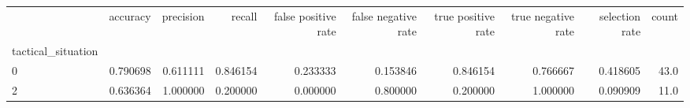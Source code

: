 \begin{tabular}{lrrrrrrrrr}
\toprule
{} &  accuracy &  precision &    recall &  false positive rate &  false negative rate &  true positive rate &  true negative rate &  selection rate &  count \\
tactical\_situation &           &            &           &                      &                      &                     &                     &                 &        \\
\midrule
0                  &  0.790698 &   0.611111 &  0.846154 &             0.233333 &             0.153846 &            0.846154 &            0.766667 &        0.418605 &   43.0 \\
2                  &  0.636364 &   1.000000 &  0.200000 &             0.000000 &             0.800000 &            0.200000 &            1.000000 &        0.090909 &   11.0 \\
\bottomrule
\end{tabular}
